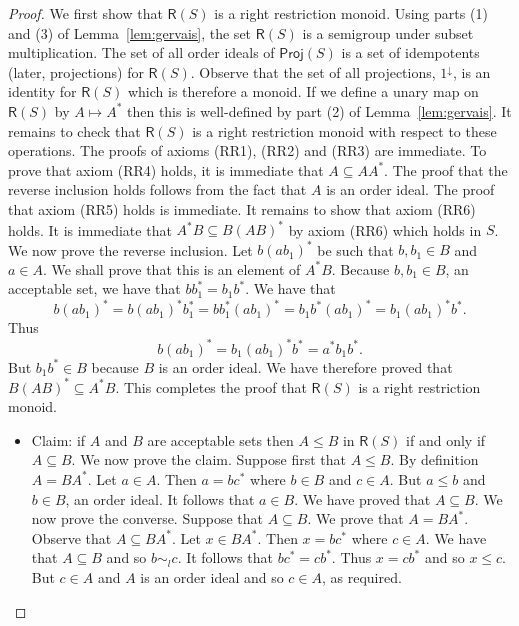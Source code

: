 \documentclass[a4paper]{amsart}
\begin{document}
\begin{proof} We first show that $\mathsf{R}(S)$ is a  right restriction monoid.
Using parts (1) and (3) of Lemma~\ref{lem:gervais}, the set $\mathsf{R}(S)$ is a semigroup under subset multiplication.
The set of all order ideals of $\mathsf{Proj}(S)$ is a set of idempotents (later, projections) for $\mathsf{R}(S)$.
Observe that the set of all projections, $1^{\downarrow}$, is an identity for $\mathsf{R}(S)$
which is therefore a monoid.
If we define a unary map on $\mathsf{R}(S)$ by $A \mapsto A^{\ast}$
then this is well-defined by part (2) of Lemma~\ref{lem:gervais}.
It remains to check that  $\mathsf{R}(S)$ is a right restriction monoid with respect to these operations.
The proofs of axioms (RR1), (RR2) and (RR3) are immediate.
To prove that axiom (RR4) holds, it is immediate that $A \subseteq AA^{\ast}$.
The proof that the reverse inclusion holds follows from the fact that $A$ is an order ideal.
The proof that axiom (RR5) holds is immediate.
It remains to show that axiom (RR6) holds.
It is immediate that $A^{\ast}B \subseteq B(AB)^{\ast}$ by axiom (RR6) which holds in $S$.
We now prove the reverse inclusion.
Let $b(ab_{1})^{\ast}$ be such that $b,b_{1} \in B$ and $a \in A$.
We shall prove that this is an element of $A^{\ast}B$.
Because $b,b_{1} \in B$, an acceptable set, 
we have that $bb_{1}^{\ast} = b_{1}b^{\ast}$.
We have that 
$$b(ab_{1})^{\ast} = b(ab_{1})^{\ast}b_{1}^{\ast} =  bb_{1}^{\ast}(ab_{1})^{\ast} = b_{1}b^{\ast}(ab_{1})^{\ast} =  b_{1}(ab_{1})^{\ast}b^{\ast}.$$
Thus
$$b(ab_{1})^{\ast} =  b_{1}(ab_{1})^{\ast}b^{\ast} = a^{\ast}b_{1}b^{\ast}.$$
But $b_{1}b^{\ast} \in B$ because $B$ is an order ideal.
We have therefore proved that $B(AB)^{\ast} \subseteq A^{\ast}B$.
This completes the proof that $\mathsf{R}(S)$ is a  right restriction monoid.




\begin{itemize}

\item Claim: if $A$ and $B$ are acceptable sets then $A \leq B$ in $\mathsf{R}(S)$ if and only if $A \subseteq B$.
We now prove the claim.
Suppose first that $A \leq B$.
By definition $A = BA^{\ast}$.
Let $a \in A$.
Then $a = bc^{\ast}$ where $b \in B$ and $c \in A$.
But $a \leq b$ and $b \in B$, an order ideal.
It follows that $a \in B$.
We have proved that $A \subseteq B$.
We now prove the converse.
Suppose that $A \subseteq B$.
We prove that $A = BA^{\ast}$.
Observe that $A \subseteq BA^{\ast}$.
Let $x \in BA^{\ast}$.
Then $x = bc^{\ast}$ where $c \in A$.
We have that $A \subseteq B$
and so $b \sim_{l} c$.
It follows that $bc^{\ast} = cb^{\ast}$.
Thus $x = cb^{\ast}$ and so $x \leq c$.
But $c \in A$ and $A$ is an order ideal and so $c \in A$, as required.


\end{itemize}
\end{proof}
\end{document}
